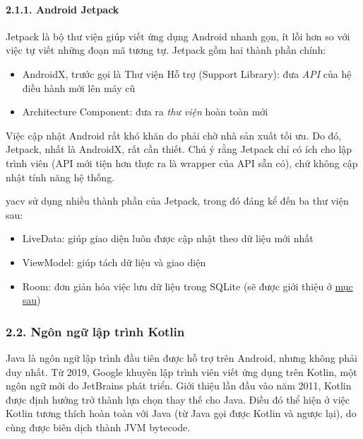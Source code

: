 \documentclass[
]{article}
\providecommand{\tightlist}{%
  \setlength{\itemsep}{0pt}\setlength{\parskip}{0pt}}
\begin{document}
\hypertarget{android-jetpack}{%
\paragraph{\texorpdfstring{2.1.1. Android Jetpack
}{2.1.1. Android Jetpack }}\label{android-jetpack}}

Jetpack là bộ thư viện giúp viết ứng dụng Android nhanh gọn, ít lỗi hơn
so với việc tự viết những đoạn mã tương tự. Jetpack gồm hai thành phần
chính:

\begin{itemize}
\tightlist
\item
  AndroidX, trước gọi là Thư viện Hỗ trợ (Support Library): đưa
  \emph{API} của hệ điều hành mới lên máy cũ
\item
  Architecture Component: đưa ra \emph{thư viện} hoàn toàn mới
\end{itemize}

Việc cập nhật Android rất khó khăn do phải chờ nhà sản xuất tối ưu. Do
đó, Jetpack, nhất là AndroidX, rất cần thiết. Chú ý rằng Jetpack chỉ có
ích cho lập trình viên (API mới tiện hơn thực ra là wrapper của API sẵn
có), chứ không cập nhật tính năng hệ thống.

yacv sử dụng nhiều thành phần của Jetpack, trong đó đáng kể đến ba thư
viện sau:

\begin{itemize}
\tightlist
\item
  LiveData: giúp giao diện luôn được cập nhật theo dữ liệu mới nhất
\item
  ViewModel: giúp tách dữ liệu và giao diện
\item
  Room: đơn giản hóa việc lưu dữ liệu trong SQLite (sẽ được giới thiệu ở
  \protect\hyperlink{P2.4.2-room}{mục sau})
\end{itemize}

\hypertarget{nguxf4n-ngux1eef-lux1eadp-truxecnh-kotlin}{%
\subsubsection{\texorpdfstring{2.2. Ngôn ngữ lập trình Kotlin
}{2.2. Ngôn ngữ lập trình Kotlin }}\label{nguxf4n-ngux1eef-lux1eadp-truxecnh-kotlin}}

Java là ngôn ngữ lập trình đầu tiên được hỗ trợ trên Android, nhưng
không phải duy nhất. Từ 2019, Google khuyên lập trình viên viết ứng dụng
trên Kotlin, một ngôn ngữ mới do JetBrains phát triển. Giới thiệu lần
đầu vào năm 2011, Kotlin được định hướng trở thành lựa chọn thay thế cho
Java. Điều đó thể hiện ở việc Kotlin tương thích hoàn toàn với Java (từ
Java gọi được Kotlin và ngược lại), do cùng được biên dịch thành JVM
bytecode.
\end{document}

